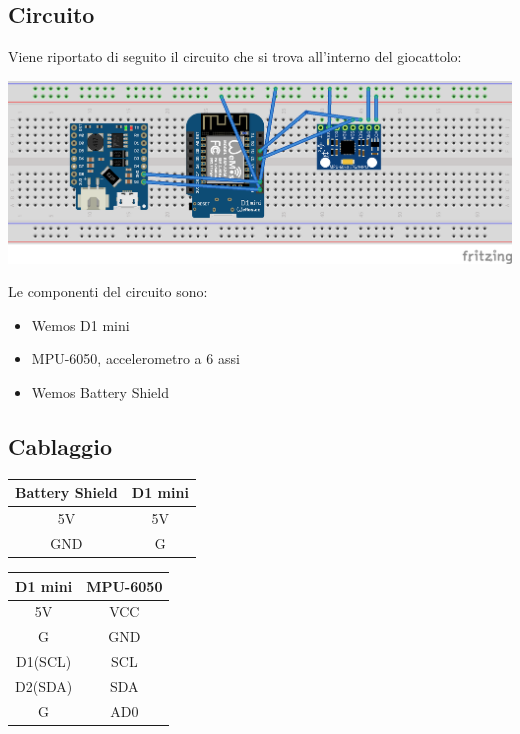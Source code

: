 \documentclass[documentation.tex]{subfiles}
\begin{document}
\subsection{Circuito}
		Viene riportato di seguito il circuito che si trova all'interno del
		giocattolo:
		
		\includegraphics[width=\textwidth]{./images/circuit.png}
		
		Le componenti del circuito sono:
		\begin{itemize}
			\item Wemos D1 mini
			\item MPU-6050, accelerometro a 6 assi
			\item Wemos Battery Shield
		\end{itemize}
		\subsection{Cablaggio}
		\begin{tabular}{|c|c|}
			\hline
			\textbf{Battery Shield} & \textbf{D1 mini} \\
			\hline
			5V & 5V \\ \hline
			GND & G \\ \hline		
		\end{tabular}
		\begin{tabular}{|c|c|}
			\hline
			\textbf{D1 mini} & \textbf{MPU-6050} \\
			\hline
			5V & VCC \\ \hline
			G & GND \\ \hline
			D1(SCL) & SCL \\ \hline
			D2(SDA) & SDA \\ \hline
			G & AD0 \\ \hline		
		\end{tabular}
\end{document}
